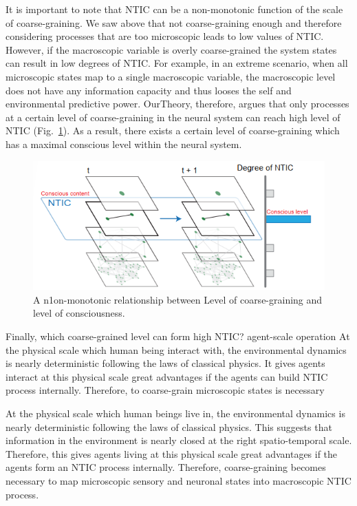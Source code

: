 \documentclass[utf8]{article}
\begin{document}
    		It is important to note that NTIC can be a non-monotonic function of the scale of coarse-graining. We saw above that not coarse-graining enough and therefore considering processes that are too microscopic leads to low values of NTIC. However, if the macroscopic variable is overly coarse-grained the system states can result in low degrees of NTIC. For example, in an extreme scenario, when all microscopic states map to a single macroscopic variable, the macroscopic level does not have any information capacity and thus looses the self and environmental predictive power. \ac{OurTheory}, therefore, argues that only processes at a certain level of coarse-graining in the neural system can reach high level of NTIC (Fig.~\ref{fig:LevelOfConsciousness}). As a result, there exists a certain level of coarse-graining which has a maximal conscious level within the neural system. 
    		
    		\begin{figure}[H]				
        		\includegraphics[width=\textwidth]{WritingMaterials/Fig_temp/FoxitReader_2019-01-31_19-03-59.png}
        		\caption{A n1on-monotonic relationship between Level of coarse-graining and level of consciousness.}
        		\label{fig:LevelOfConsciousness}
    		\end{figure}
            
            
            
            Finally, which coarse-grained level can form high NTIC? 
            agent-scale operation
            At the physical scale which human being interact with, the environmental dynamics is nearly deterministic following the laws of classical physics. It gives agents interact at this physical scale great advantages if the agents can build NTIC process internally. Therefore, to coarse-grain microscopic states is necessary
    	   
    
            At the physical scale which human beings live in, the environmental dynamics is nearly deterministic following the laws of classical physics. This suggests that information in the environment is nearly closed at the right spatio-temporal scale. Therefore, this gives agents living at this physical scale great advantages if the agents form an NTIC process internally. Therefore, coarse-graining becomes necessary to map microscopic sensory and neuronal states into macroscopic NTIC process. 
            	   
\end{document}
